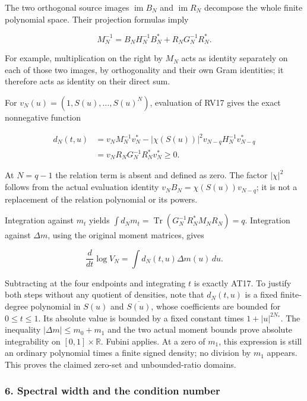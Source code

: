 The two orthogonal source images \(\operatorname{im}B_N\) and \(\operatorname{im}R_N\) decompose the whole finite polynomial space. Their projection formulas imply

\[
M_N^{-1}=B_NH_N^{-1}B_N^*+
R_NG_N^{-1}R_N^*.
\tag{RV17}
\]

For example, multiplication on the right by \(M_N\) acts as identity separately on each of those two images, by orthogonality and their own Gram identities; it therefore acts as identity on their direct sum.

For \(v_N(u)=(1,S(u),\ldots,S(u)^N)\), evaluation of RV17 gives the exact nonnegative function

\[
\begin{aligned}
d_N(t,u)
&=v_NM_N^{-1}v_N^*
-|\chi(S(u))|^2v_{N-q}H_N^{-1}v_{N-q}^*\\
&=v_NR_NG_N^{-1}R_N^*v_N^*\ge0.
\end{aligned}
\tag{RV18}
\]

At \(N=q-1\) the relation term is absent and defined as zero. The factor \(|\chi|^2\) follows from the actual evaluation identity \(v_N B_N=\chi(S(u))v_{N-q}\); it is not a replacement of the relation polynomial or its powers.

Integration against \(m_t\) yields \(\int d_Nm_t=\operatorname{Tr}(G_N^{-1}R_N^*M_NR_N)=q\). Integration against \(\Delta m\), using the original moment matrices, gives

\[
\frac d{dt}\log V_N=\int d_N(t,u)\Delta m(u)\,du.
\tag{RV19}
\]

Subtracting at the four endpoints and integrating \(t\) is exactly AT17. To justify both steps without any quotient of densities, note that \(d_N(t,u)\) is a fixed finite-degree polynomial in \(S(u)\) and \(\overline{S(u)}\), whose coefficients are bounded for \(0\le t\le1\). Its absolute value is bounded by a fixed constant times \(1+|u|^{2N_*}\). The inequality \(|\Delta m|\le m_0+m_1\) and the two actual moment bounds prove absolute integrability on \([0,1]\times\mathbb R\). Fubini applies. At a zero of \(m_1\), this expression is still an ordinary polynomial times a finite signed density; no division by \(m_1\) appears. This proves the claimed zero-set and unbounded-ratio domains.

\subsubsection{6. Spectral width and the condition number}\label{endpoint-determinant_review--spectral-width-and-the-condition-number}

